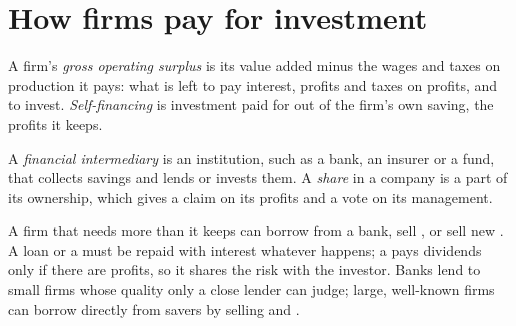 \section{How firms pay for investment}\label{sec:g12:saving-and-investment:firms}

\begin{definition}\label{def:g12:saving-and-investment:gross-operating-surplus}
A firm's \emph{gross operating surplus} is its value added minus the wages and taxes on production it pays: what is left to pay interest,
profits and taxes on profits, and to invest. \emph{Self-financing}\label{def:g12:saving-and-investment:self-financing} is investment
paid for out of the firm's own saving, the profits it keeps.
\end{definition}

\begin{definition}\label{def:g12:saving-and-investment:intermediary}
A \emph{financial intermediary} is an institution, such as a bank, an insurer or a fund, that collects savings and lends or invests them. A
\emph{share}\label{def:g12:saving-and-investment:share} in a company is a part of its ownership, which gives a claim on its
profits and a vote on its management.
\end{definition}

A firm that needs more than it keeps can borrow from a bank, sell , or sell new . A loan or a  must be repaid with interest whatever happens; a  pays
dividends only if there are profits, so it shares the risk with the investor. Banks lend to small firms whose quality only a close lender can judge; large, well-known firms
can borrow directly from savers by selling  and .

